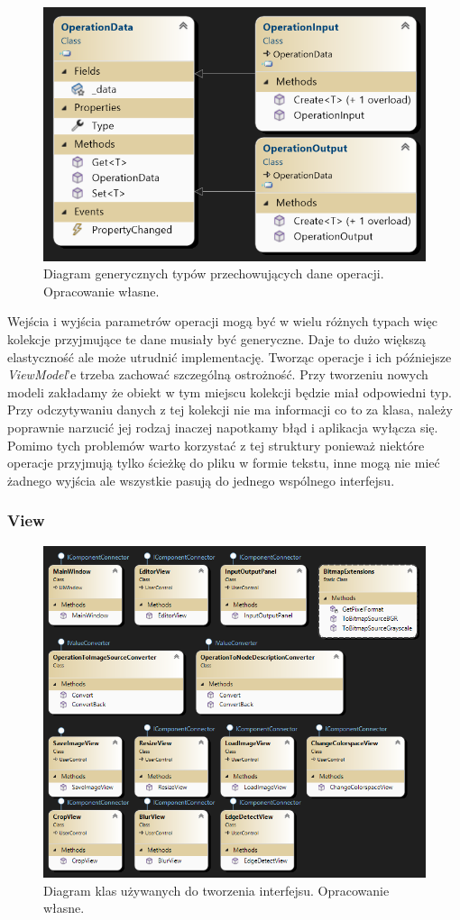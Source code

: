\begin{figure}[H]
    \centering
    \includegraphics[width=0.6\linewidth]{images/Picture12.png}
    \caption{Diagram generycznych typów przechowujących dane operacji. Opracowanie własne.}
    \label{fig:input}
\end{figure}

Wejścia i wyjścia parametrów operacji mogą być w wielu różnych typach więc kolekcje przyjmujące te dane musiały być generyczne. 
Daje to dużo większą elastyczność ale może utrudnić implementację. 
Tworząc operacje i ich późniejsze \textit{ViewModel}'e trzeba zachować szczególną ostrożność. 
Przy tworzeniu nowych modeli zakładamy że obiekt w tym miejscu kolekcji będzie miał odpowiedni typ. 
Przy odczytywaniu danych z tej kolekcji nie ma informacji co to za klasa, należy poprawnie narzucić jej rodzaj inaczej napotkamy błąd i aplikacja wyłącza się.
Pomimo tych problemów warto korzystać z tej struktury ponieważ niektóre operacje przyjmują tylko ścieżkę do pliku w formie tekstu, inne mogą nie mieć żadnego wyjścia ale wszystkie pasują do jednego wspólnego interfejsu.

\subsubsection{View} 

\begin{figure}[H]
    \centering
    \includegraphics[width=0.8\linewidth]{images/Picture19.png}
    \caption{Diagram klas używanych do tworzenia interfejsu. Opracowanie własne.}
    \label{fig:viewArch}
\end{figure}

